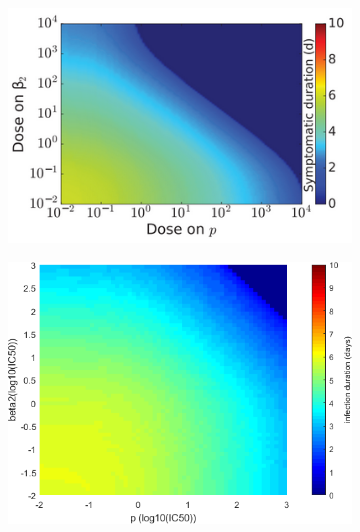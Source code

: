 \documentclass[a4paper,11pt]{article}
\begin{document}
\begin{figure}[H]
    \centering
    \begin{subfigure}{0.4\textwidth}

    \includegraphics[width=\textwidth]{MBeta2PT.png}
    \end{subfigure}
    \begin{subfigure}{0.35\textwidth}

    \includegraphics[width=\textwidth]{Beta2P_times.png}
    \end{subfigure}

    \begin{subfigure}{0.4\textwidth}


\end{subfigure}
\end{figure}
\end{document}
